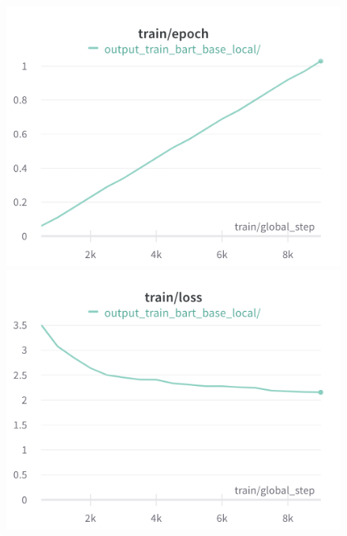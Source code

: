 \begin{figure}[!htb]
\includegraphics[width=\linewidth]{wandb/charts/Section-8-Panel-0-b9jdvbp9c}
\caption{}
\endminipage\hfill
{}
\includegraphics[width=\linewidth]{wandb/charts/Section-8-Panel-1-uc1nwfci0}
\caption{}
\endminipage
\end{figure}

